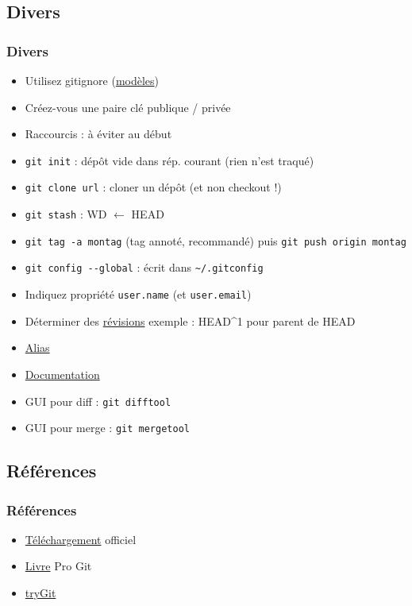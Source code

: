 \documentclass[english, french]{beamer}
\begin{document}
\subsection{Divers}
\begin{frame}
	\frametitle{Divers}
	\vspace{-1pt}
	\begin{itemize}
		\item Utilisez gitignore {\tiny (\href{https://github.com/github/gitignore}{modèles})}
		\item Créez-vous une paire clé publique / privée
		\item Raccourcis : à éviter au début
		\item \texttt{git init} : dépôt vide dans rép. courant (rien n’est traqué)
		\item \texttt{git clone url} : cloner un dépôt (et non checkout !)
		\item \texttt{git stash} : WD $←$ HEAD
		\item \texttt{git tag -a montag} {\tiny (tag annoté, recommandé)} puis \texttt{git push origin montag}
		\item \texttt{git config -{}-global} : écrit dans \texttt{\textasciitilde/.gitconfig}
		\item Indiquez propriété \texttt{user.name} (et \texttt{user.email})
		\item Déterminer des \href{https://git-scm.com/book/en/v2/Git-Tools-Revision-Selection}{révisions} {\tiny exemple : HEAD\textasciicircum 1 pour parent de HEAD}
		\item \href{https://git-scm.com/book/en/v2/Git-Basics-Git-Aliases}{Alias}
		\item \href{https://git-scm.com/book/en/v2}{Documentation}
		\item GUI pour diff : \texttt{git difftool}
		\item GUI pour merge : \texttt{git mergetool}
	\end{itemize}
\end{frame}

\subsection{Références}
\begin{frame}
	\frametitle{Références}
	\begin{itemize}
		\item \href{https://git-scm.com/downloads}{Téléchargement} officiel
		\item \href{https://git-scm.com/book/}{Livre} Pro Git
		\item \href{https://try.github.io/}{tryGit}
	\end{itemize}
\end{frame}
\end{document}

